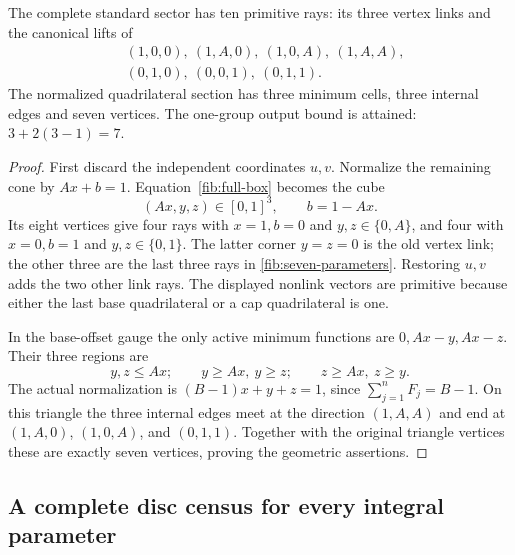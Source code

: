 \begin{proposition}
\label{fib:seven}
The complete standard sector has ten primitive rays: its three vertex
links and the canonical lifts of
\begin{equation}
 \begin{split}
 &(1,0,0),\ (1,A,0),\ (1,0,A),\ (1,A,A),\\
 &(0,1,0),\ (0,0,1),\ (0,1,1).
 \end{split}
 \label{fib:seven-parameters}
\end{equation}
The normalized quadrilateral section has three minimum cells, three
internal edges and seven vertices.  The one-group output bound is attained:
\(3+2(3-1)=7\).
\end{proposition}
\begin{proof}
First discard the independent coordinates \(u,v\).  Normalize the
remaining cone by \(Ax+b=1\).  Equation~\eqref{fib:full-box} becomes
the cube
\[
 (Ax,y,z)\in[0,1]^3,\qquad b=1-Ax.
\]
Its eight vertices give four rays with \(x=1,b=0\) and
\(y,z\in\{0,A\}\), and four with \(x=0,b=1\) and
\(y,z\in\{0,1\}\).  The latter corner \(y=z=0\) is the old
vertex link; the other three are the last three rays in
\eqref{fib:seven-parameters}.  Restoring \(u,v\) adds the two other
link rays.  The displayed nonlink vectors are primitive because either
the last base quadrilateral or a cap quadrilateral is one.

In the base-offset gauge the only active minimum functions are
\(0,Ax-y,Ax-z\).  Their three regions are
\[
 y,z\leq Ax;\qquad y\geq Ax,\ y\geq z;\qquad
 z\geq Ax,\ z\geq y.
\]
The actual normalization is \((B-1)x+y+z=1\), since
\(\sum_{j=1}^nF_j=B-1\).  On this triangle the three internal edges
meet at the direction \((1,A,A)\) and end at
\((1,A,0)\), \((1,0,A)\), and \((0,1,1)\).
Together with the original triangle vertices these are exactly seven
vertices, proving the geometric assertions.
\end{proof}

\subsection{A complete disc census for every integral parameter}
\label{fib:topology}

